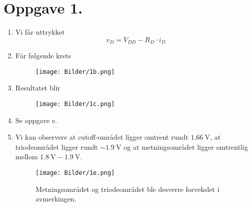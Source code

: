 \documentclass[a4paper,11pt,norsk]{article}
\begin{document}


\section*{Oppgave 1.}
\begin{enumerate}
    \item Vi får uttrykket
        \[
            v_D = V_{DD} - R_D \cdot i_D
        \]
    \item Får følgende krets
        \begin{figure}[H]
            \centering
            \texttt{[image: Bilder/1b.png]}
        \end{figure}
    \item Resultatet blir
        \begin{figure}[H]
            \centering
            \texttt{[image: Bilder/1c.png]}
        \end{figure}
        \newpage
    \item Se oppgave e.
    \item Vi kan observere at cutoff-området ligger omtrent rundt $\SI{1.66}{\volt}$, at triodeområdet ligger rundt 
        $\sim\SI{1.9}{\volt}$ og at metningsområdet ligger omtrentlig mellom $\SI{1.8}{\volt}-\SI{1.9}{\volt}$.
        \begin{figure}[H]
            \centering
            \texttt{[image: Bilder/1e.png]}
            \caption{Metningsområdet og triodeområdet ble desverre forvekslet i avmerkingen.}
        \end{figure}
\end{enumerate}
\end{document}
